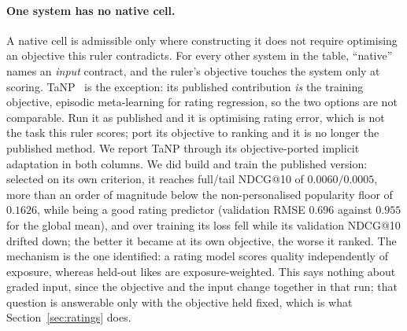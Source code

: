 \documentclass[manuscript,screen]{acmart}
\begin{document}
\paragraph{One system has no native cell.}\label{sec:nativelimit} A native cell is admissible only where constructing it does not require optimising an objective this ruler contradicts. For every other system in the table, ``native'' names an \emph{input} contract, and the ruler's objective touches the system only at scoring. TaNP~\citep{lin2021tanp} is the exception: its published contribution \emph{is} the training objective, episodic meta-learning for rating regression, so the two options are not comparable. Run it as published and it is optimising rating error, which is not the task this ruler scores; port its objective to ranking and it is no longer the published method. We report TaNP through its objective-ported implicit adaptation in both columns. We did build and train the published version: selected on its own criterion, it reaches full/tail NDCG@10 of $0.0060/0.0005$, more than an order of magnitude below the non-personalised popularity floor of $0.1626$, while being a good rating predictor (validation RMSE $0.696$ against $0.955$ for the global mean), and over training its loss fell while its validation NDCG@10 drifted down; the better it became at its own objective, the worse it ranked. The mechanism is the one \citet{cremonesi2010performance} identified: a rating model scores quality independently of exposure, whereas held-out likes are exposure-weighted. This says nothing about graded input, since the objective and the input change together in that run; that question is answerable only with the objective held fixed, which is what Section~\ref{sec:ratings} does.
\end{document}
